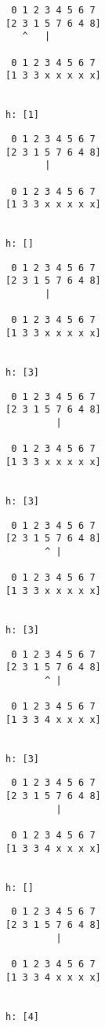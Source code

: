 { \begin{verbatim}
 0 1 2 3 4 5 6 7
[2 3 1 5 7 6 4 8]
   ^   |

 0 1 2 3 4 5 6 7
[1 3 3 x x x x x]


h: [1]
\end{verbatim} }

{ \begin{verbatim}
 0 1 2 3 4 5 6 7
[2 3 1 5 7 6 4 8]
       |

 0 1 2 3 4 5 6 7
[1 3 3 x x x x x]


h: []
\end{verbatim} }

{ \begin{verbatim}
 0 1 2 3 4 5 6 7
[2 3 1 5 7 6 4 8]
       |

 0 1 2 3 4 5 6 7
[1 3 3 x x x x x]


h: [3]
\end{verbatim} }

{ \begin{verbatim}
 0 1 2 3 4 5 6 7
[2 3 1 5 7 6 4 8]
         |

 0 1 2 3 4 5 6 7
[1 3 3 x x x x x]


h: [3]
\end{verbatim} }

{ \begin{verbatim}
 0 1 2 3 4 5 6 7
[2 3 1 5 7 6 4 8]
       ^ |

 0 1 2 3 4 5 6 7
[1 3 3 x x x x x]


h: [3]
\end{verbatim} }

{ \begin{verbatim}
 0 1 2 3 4 5 6 7
[2 3 1 5 7 6 4 8]
       ^ |

 0 1 2 3 4 5 6 7
[1 3 3 4 x x x x]


h: [3]
\end{verbatim} }

{ \begin{verbatim}
 0 1 2 3 4 5 6 7
[2 3 1 5 7 6 4 8]
         |

 0 1 2 3 4 5 6 7
[1 3 3 4 x x x x]


h: []
\end{verbatim} }

{ \begin{verbatim}
 0 1 2 3 4 5 6 7
[2 3 1 5 7 6 4 8]
         |

 0 1 2 3 4 5 6 7
[1 3 3 4 x x x x]


h: [4]
\end{verbatim} }


